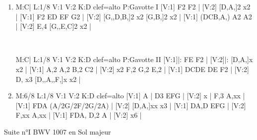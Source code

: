 \documentclass[a4paper,twoside]{article}
\begin{document}
\begin{center}
\begin{itemize}
\begin{enumerate}
  \item {}
\begin{abcsvg}
  M:C|
  L:1/8
  V:1
  V:2
  K:D clef=alto
  P:Gavotte I
  [V:1] F2 F2 |
  [V:2] [D,A,]2 x2 |
  [V:1] F2 ED EF G2 |
  [V:2] [G,,D,B,]2 x2 [G,B,]2 x2 |
  [V:1] (DCB,A,) A2 A2 |
  [V:2] E,4 [G,,E,C]2 x2 |
\end{abcsvg}
  \\
  \hspace*{\titlelen}
\begin{abcsvg}
  M:C|
  L:1/8
  V:1
  V:2
  K:D clef=alto
  P:Gavotte II
  [V:1]|: FE F2 |
  [V:2]|: [D,A,]x x2 |
  [V:1] A,2 A,2 B,2 C2 |
  [V:2] x2 F,2 G,2 E,2 |
  [V:1] DCDE DE F2 |
  [V:2] D, x3 [D,,A,,F,]x x2 |
\end{abcsvg}
  \makebox[2cm][l]{ \dotfill\ \pageref{VIgavottes}}
  \par\vspace{\titleseplen}

  \item {}
\begin{abcsvg}
  M:6/8
  L:1/8
  V:1
  V:2
  K:D clef=alto
  [V:1] A | D3  EFG |
  [V:2] x | F,3 A,xx |
  [V:1] FDA (A/2G/2F/2G/2A) |
  [V:2] [D,A,]xx x3 |
  [V:1] DA,D EFG |
  [V:2] F,xx A,xx |
  [V:1] FDA, D,2 A |
  [V:2] x6 |
\end{abcsvg}
  \makebox[2cm][l]{ \dotfill\ \pageref{VIgigue}}
  \end{enumerate}

\end{itemize}

\end{center}

\cleardoublepage
\label{SuiteI}
\vspace*{2cm}

\begin{center}
\Large Suite n°I BWV 1007 en Sol majeur
\end{center}

\vspace{3cm}
\end{document}
